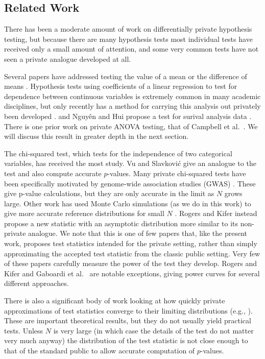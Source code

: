 
\subsection{Related Work}


There has been a moderate amount of work on differentially private hypothesis testing, but because there are many hypothesis tests most individual tests have received only a small amount of attention, and some very common tests have not seen a private analogue developed at all.  


Several papers have addressed testing the value of a mean or the difference of means \cite{solea2014differentially, d2015differential, ding2018comparing}.  Hypothesis tests using coefficients of a linear regression to test for dependence between continuous variables is extremely common in many academic disciplines, but only recently has a method for carrying this analysis out privately been developed \cite{sheffet2015differentially, barrientos2017differentially}. and Nguy{\^e}n and Hui propose a test for surival analysis data \cite{nguyen2017differentially}.  There is one prior work on private ANOVA testing, that of  Campbell et al.~\cite{campbell2018diffprivanova}.  We will discuss this result in greater depth in the next section.


The chi-squared test, which tests for the independence of two categorical variables, has received the most study.  Vu and Slavkovi\'{c} \cite{vu2009differential} give an analogue to the test and also compute accurate $p$-values.   Many private chi-squared tests have been specifically motivated by genome-wide association studies (GWAS)  \cite{fienberg2011privacy, uhlerop2013privacy, johnson2013privacy}.  These give p-value calculations, but they are only accurate in the limit as $N$ grows large.  Other work has used Monte Carlo simulations (as we do in this work) to give more accurate reference distributions for small $N$ \cite{gaboardi2016differentially, wang2015revisiting}.  Rogers and Kifer \cite{rogers2017new} instead propose a new statistic with an asymptotic distribution more similar to its non-private analogue.  We note that this is one of few papers that, like the present work, proposes test statistics intended for the private setting, rather than simply approximating the accepted test statistic from the classic public setting. Very few of these papers carefully measure the power of the test they develop.  Rogers and Kifer \cite{rogers2017new} and Gaboardi et al.~\cite{gaboardi2016differentially} are notable exceptions, giving power curves for several different approaches.


There is also a significant body of work looking at how quickly private approximations of test statistics converge to their limiting distributions (e.g., \cite{smith2008efficient, wasserman2010statistical, smith2011privacy}).  These are important theoretical results, but they do not usually yield practical tests.  Unless $N$ is very large (in which case the details of the test do not matter very much anyway) the distribution of the test statistic is not close enough to that of the standard public to allow accurate computation of $p$-values.